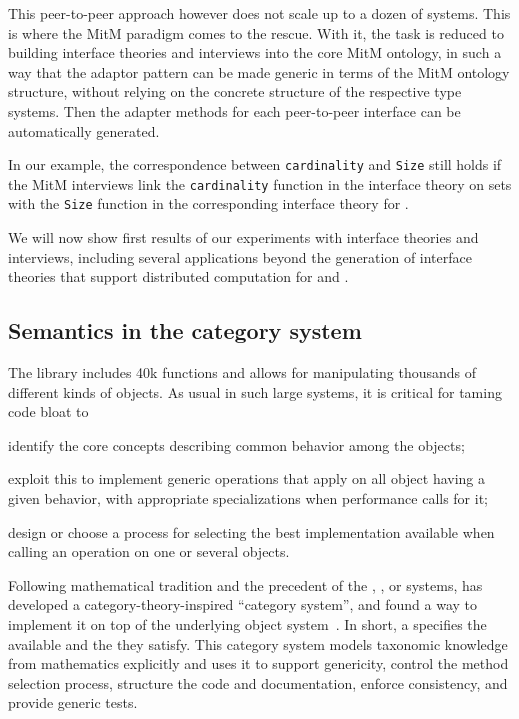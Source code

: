 This peer-to-peer approach however does not scale up to a dozen of
systems. This is where the MitM paradigm comes to the rescue. With it,
the task is reduced to building interface theories and interviews into
the core MitM ontology, in such a way that the adaptor pattern can be
made generic in terms of the MitM ontology structure, without relying
on the concrete structure of the respective type systems. Then the
adapter methods for each peer-to-peer interface can be automatically
generated.

In our example, the correspondence between \texttt{cardinality} and
\texttt{Size} still holds if the MitM interviews link the
\texttt{cardinality} function in the \Sage interface theory on sets
with the \texttt{Size} function in the corresponding interface theory
for \GAP.

We will now show first results of our experiments with interface
theories and interviews, including several applications beyond the
generation of interface theories that support distributed computation
for \Sage and \GAP.

\subsection{Semantics in the \Sage category system}

The \Sage library includes 40k functions and allows for manipulating
thousands of different kinds of objects. As usual in such large
systems, it is critical for taming code bloat to
\begin{compactenum}[\em i\rm)]
\item identify the core concepts describing common behavior among the objects;
\item exploit this to implement generic operations that apply on all object having a given
  behavior, with appropriate specializations when performance calls for it;
\item design or choose a process for selecting the best implementation available when
  calling an operation on one or several objects.
\end{compactenum}

Following mathematical tradition and the precedent of the \Axiom,
\Fricas, or \MuPAD systems, \Sage has developed a
category-theory-inspired ``category system'', and found a way to
implement it on top of the underlying \Python object
system~\cite{Sage,Sage.Categories}. In short, a  specifies
the available  and the  they satisfy.
%
This category system models taxonomic knowledge from mathematics
explicitly and uses it to support genericity, control the method
selection process, structure the code and documentation, enforce
consistency, and provide generic tests.

